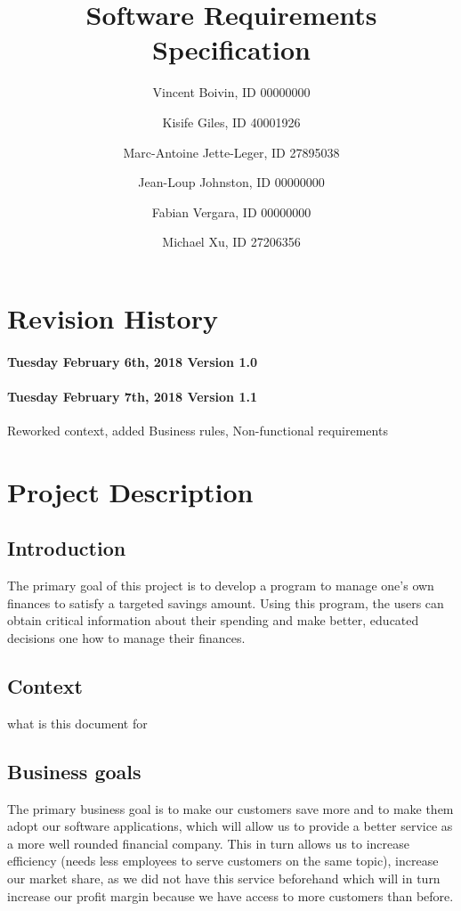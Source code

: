 \documentclass[letterpaper]{article}
\title{Software Requirements Specification}
\author{
	Vincent Boivin, ID 00000000 \and
	Kisife Giles, ID 40001926 \and
	Marc-Antoine Jette-Leger, ID 27895038 \and
	Jean-Loup Johnston, ID 00000000 \and
	Fabian Vergara, ID 00000000 \and
	Michael Xu, ID 27206356
}
\begin{document}
	
\maketitle

\newpage

\section{Revision History}

	\paragraph{Tuesday February 6th, 2018 Version 1.0}  
	
	
	\paragraph{Tuesday February 7th, 2018 Version 1.1}  
	Reworked context, added Business rules, Non-functional requirements
	
	
\newpage

\tableofcontents

\newpage
	
\section{Project Description}

	\subsection{Introduction}
	
		The primary goal of this project is to develop a program to manage one’s own finances to satisfy a targeted savings amount. Using this program, the users can obtain critical information about their spending and make better, educated decisions one how to manage their finances.
	
	\subsection{Context}
	
		what is this document for
	
	\subsection{Business goals}
	
		The primary business goal is to make our customers save more and to make them adopt our software applications, which will allow us to provide a better service as a more well rounded financial company. This in turn allows us to increase efficiency (needs less employees to serve customers on the same topic), increase our market share, as we did not have this service beforehand which will in turn increase our profit margin because we have access to more customers than before.
	
\end{document}
